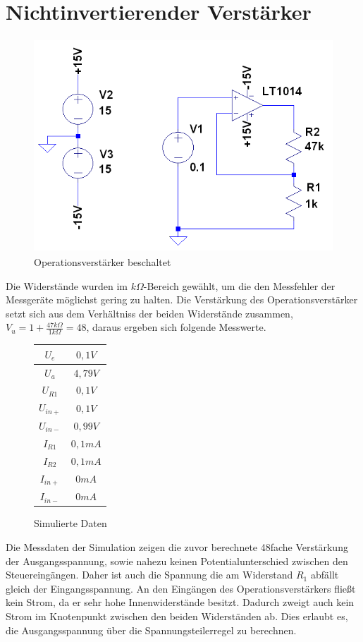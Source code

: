 
\section{Nichtinvertierender Verst\"arker}

\begin{figure}[H]
 \centering
 \includegraphics[height=8cm,width=12cm]{Simulationen/OPV}
 \caption{Operationsverstärker beschaltet}
\end{figure}

Die Widerstände wurden im $k\Omega$-Bereich gewählt, um die den Messfehler der Messgeräte möglichst gering zu halten. Die Verstärkung des Operationsverstärker setzt
sich aus dem Verhältniss der beiden Widerstände zusammen, $V_u=1+\frac{47k\Omega}{1k\Omega}=48$, daraus ergeben sich folgende Messwerte.\\

\begin{figure}[H]
 \centering
 \begin{tabular}{c|c}
 $U_e$ 		& $0,1V$ 	\\ \hline
 $U_a$ 		& $4,79V$ 	\\ \hline
 $U_{R1}$ 	& $0,1V$ 	\\ \hline
 $U_{in+}$	& $0,1V$ 	\\ \hline
 $U_{in-}$ 	& $0,99V$ 	\\ \hline
 $I_{R1}$ 	& $0,1mA$ 	\\ \hline
 $I_{R2}$ 	& $0,1mA$ 	\\ \hline
 $I_{in+}$ 	& $0mA$ 	\\ \hline
 $I_{in-}$ 	& $0mA$ 	\\ \hline
 \end{tabular}
 \caption{Simulierte Daten}
\end{figure}
\noindent
Die Messdaten der Simulation zeigen die zuvor berechnete 48fache Verstärkung der Ausgangsspannung, sowie nahezu keinen Potentialunterschied zwischen den Steuereingängen.
Daher ist auch die Spannung die am Widerstand $R_1$ abfällt gleich der Eingangsspannung. An den Eingängen des Operationsverstärkers fließt kein Strom, da er
sehr hohe Innenwiderstände besitzt. Dadurch zweigt auch kein Strom im Knotenpunkt zwischen den beiden Widerständen ab. Dies erlaubt es, die Ausgangsspannung über die 
Spannungsteilerregel zu berechnen.\\

